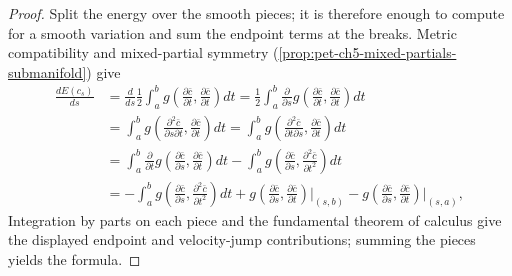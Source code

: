 \begin{proof}
  \leanok
  \sketch
  Split the energy over the smooth pieces; it is therefore enough to compute for
  a smooth variation and sum the endpoint terms at the breaks.  Metric compatibility
  and mixed-partial symmetry (\cref{prop:pet-ch5-mixed-partials-submanifold}) give
  \begin{align*}
    \frac{dE(c_s)}{ds}
    &=\frac{d}{ds}\frac12\int_a^bg\!\left(\frac{\partial\bar c}{\partial t},\frac{\partial\bar c}{\partial t}\right)dt
    =\frac12\int_a^b\frac{\partial}{\partial s}g\!\left(\frac{\partial\bar c}{\partial t},\frac{\partial\bar c}{\partial t}\right)dt\\
    &=\int_a^bg\!\left(\frac{\partial^2\bar c}{\partial s\partial t},\frac{\partial\bar c}{\partial t}\right)dt
    =\int_a^bg\!\left(\frac{\partial^2\bar c}{\partial t\partial s},\frac{\partial\bar c}{\partial t}\right)dt\\
    &=\int_a^b\frac{\partial}{\partial t}g\!\left(\frac{\partial\bar c}{\partial s},\frac{\partial\bar c}{\partial t}\right)dt
      -\int_a^bg\!\left(\frac{\partial\bar c}{\partial s},\frac{\partial^2\bar c}{\partial t^2}\right)dt\\
    &=-\int_a^bg\!\left(\frac{\partial\bar c}{\partial s},\frac{\partial^2\bar c}{\partial t^2}\right)dt
      +g\!\left(\frac{\partial\bar c}{\partial s},\frac{\partial\bar c}{\partial t}\right)\Big|_{(s,b)}
      -g\!\left(\frac{\partial\bar c}{\partial s},\frac{\partial\bar c}{\partial t}\right)\Big|_{(s,a)},
  \end{align*}
  Integration by parts on each piece and the fundamental theorem of calculus give
  the displayed endpoint and velocity-jump contributions; summing the pieces yields
  the formula.
\end{proof}

